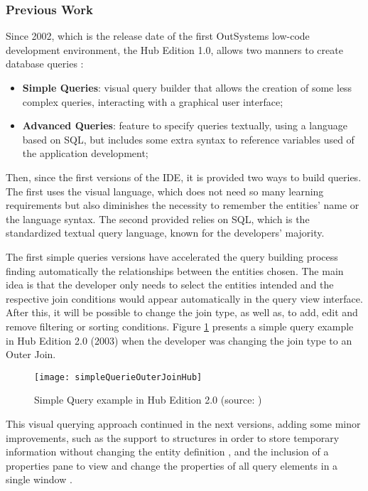 \subsubsection{Previous Work}
\label{subsubsec:previous_work}

Since 2002, which is the release date of the first OutSystems low-code development environment, the Hub Edition 1.0, allows two manners to create database queries \cite{whatsNotNewInOutsystems}:

\begin{itemize}
	\item \textbf{Simple Queries}: visual query builder that allows the creation of some less complex queries, interacting with a graphical user interface;
	\item \textbf{Advanced Queries}: feature to specify queries textually, using a language based on \gls{SQL}, but includes some extra syntax to reference variables used of the application development;
\end{itemize}

Then, since the first versions of the \gls{IDE}, it is provided two ways to build queries. The first uses the visual language, which does not need so many learning requirements but also diminishes the necessity to remember the entities' name or the language syntax. The second provided relies on \gls{SQL}, which is the standardized textual query language, known for the developers' majority.

The first simple queries versions have accelerated the query building process finding automatically the relationships between the entities chosen. The main idea is that the developer only needs to select the entities intended and the respective join conditions would appear automatically in the query view interface. After this, it will be possible to change the join type, as well as, to add, edit and remove filtering or sorting conditions. Figure \ref{fig:ss_simpleQuerieOuterJoinHub2} presents a simple query example in Hub Edition 2.0 (2003) when the developer was changing the join type to an Outer Join.

\begin{figure}[htbp]
	\centering
	\texttt{[image: simpleQuerieOuterJoinHub]}
	\caption{Simple Query example in Hub Edition 2.0 (source: \cite{whatsNewHub2})}
	\label{fig:ss_simpleQuerieOuterJoinHub2}
\end{figure}

This visual querying approach continued in the next versions, adding some minor improvements, such as the support to structures in order to store temporary information without changing the entity definition \cite{whatsNewHub22}, and the inclusion of a properties pane to view and change the properties of all query elements in a single window \cite{agilePlatform5}.

